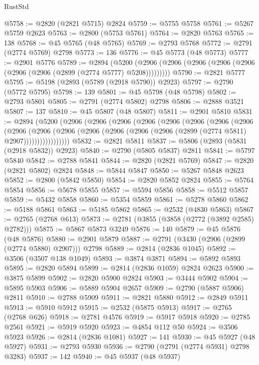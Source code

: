 \begin{lexlean}{RustStd}
\begin{coremodule}
@5758 := @2820 (@2821 @5715) @2824
@5759 := @5755 @5758
@5761 := @5267 @5759 @2623
@5763 := @2800 (@5753 @5761)
@5764 := @2820 @5763
@5765 := 138
@5768 := @45 @5765 (@48 @5765)
@5769 := @2793 @5768
@5772 := @2791 (@2774 @5769) @2798
@5773 := 136
@5776 := @45 @5773 (@48 @5773)
@5777 := @2901 @5776
@5789 := @2894
    (@5200 (@2906 (@2906 (@2906 (@2906 (@2906 (@2906 (@2906 (@2899 (@2774 @5777) @5208)))))))))
@5790 := @2821 @5777
@5795 := @5198 (@2893 (@5789 (@2918 @5790)) @2923)
@5797 := @2790 (@5772 @5795)
@5798 := 139
@5801 := @45 @5798 (@48 @5798)
@5802 := @2793 @5801
@5805 := @2791 (@2774 @5802) @2798
@5806 := @2888 @3521
@5807 := 137
@5810 := @45 @5807 (@48 @5807)
@5811 := @2901 @5810
@5831 := @2894
    (@5200
      (@2906
        (@2906
          (@2906
            (@2906
              (@2906
                (@2906
                  (@2906
                    (@2906
                      (@2906
                        (@2906
                          (@2906
                            (@2906 (@2906 (@2906 (@2906 (@2899 (@2774 @5811) @2907)))))))))))))))))
@5832 := @2821 @5811
@5837 := @5806 (@2893 (@5831 (@2918 @5832)) @2923)
@5840 := @2790 (@5805 @5837) @2811
@5841 := @5797 @5840
@5842 := @2788 @5841
@5844 := @2820 (@2821 @5769)
@5847 := @2820 (@2821 @5802) @2824
@5848 := @5844 @5847
@5850 := @5267 @5848 @2623
@5852 := @2800 (@5842 @5850)
@5854 := @2820 @5852 @2824
@5855 := @5764 @5854
@5856 := @5678 @5855
@5857 := @5594 @5856
@5858 := @5512 @5857
@5859 := @5432 @5858
@5860 := @5354 @5859
@5861 := @5278 @5860
@5862 := @5188 @5861
@5863 := @5185 @5862
@5865 := @2532 (@4830 @5863)
@5867 := @2765 (@2768 @613)
@5873 := @2781 (@3855 (@3858 (@2772 (@3892 @2585) @2782)))
@5875 := @5867 @5873 @3249
@5876 := 140
@5879 := @45 @5876 (@48 @5876)
@5880 := @2901 @5879
@5887 := @2791 (@3430 (@2906 (@2899 (@2774 @5880) @2907))) @2798
@5889 := @2814 (@2836 @1045)
@5892 := @3506 (@3507 @138 @1049)
@5893 := @3874 @3871
@5894 := @5892 @5893
@5895 := @2820 @5894
@5899 := @2814 (@2836 @1059) @2824 @2623
@5900 := @3875 @5899
@5902 := @2820 @5900 @2824
@5903 := @3444 @5902
@5904 := @5895 @5903
@5906 := @5889 @5904 @2657
@5909 := @2790 (@5887 @5906) @2811
@5910 := @2788 @5909
@5911 := @2821 @5880
@5912 := @2849 @5911
@5913 := @5910 @5912
@5915 := @2532 (@5875 @5913)
@5917 := @2765 (@2768 @626)
@5918 := @2781 @4576
@5919 := @5917 @5918
@5920 := @2785 @2561
@5921 := @5919 @5920
@5923 := @4854 @112 @50
@5924 := @3506 @5923
@5926 := @2814 (@2836 @1081)
@5927 := 141
@5930 := @45 @5927 (@48 @5927)
@5931 := @2793 @5930
@5936 := @2790 (@2791 (@2774 @5931) @2798 @3283)
@5937 := 142
@5940 := @45 @5937 (@48 @5937)

\end{coremodule}
\end{lexlean}
